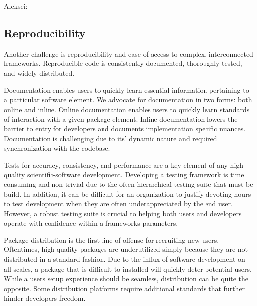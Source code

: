 \documentclass{amsart}
\newcommand{\AGSNote}[1]{{\color{cyan}Aleksei: #1}}
\begin{document}
\AGSNote{
\subsection{Reproducibility}

Another challenge is reproducibility and ease of access to complex, interconnected frameworks. Reproducible code is consistently documented, thoroughly tested, and widely distributed. 

Documentation enables users to quickly learn essential information pertaining to a particular software element. We advocate for documentation in two forms: both online and inline. Online documentation enables users to quickly learn standards of interaction with a given package element.  Inline documentation lowers the barrier to entry for  developers and documents implementation specific nuances. Documentation is challenging due to its' dynamic nature and required synchronization with the codebase. 

Tests for accuracy, consistency, and performance are a key element of any high quality scientific-software development. Developing a testing framework is time consuming and non-trivial due to the often hierarchical testing suite that must be build. In addition, it can be difficult for an organization to justify devoting hours to test development when they are often underappreciated by the end user. However, a robust testing suite is crucial to helping both users and developers operate with confidence within a frameworks parameters. 

Package distribution is the first line of offense for recruiting new users. Oftentimes, high quality packages are underutilized simply because they are not distributed in a standard fashion. Due to the influx of software development on all scales, a package that is difficult to installed will quickly deter potential users. While a users setup experience should be seamless, distribution can be quite the opposite. Some distribution platforms require additional standards that further hinder developers freedom. 
}
\end{document}
